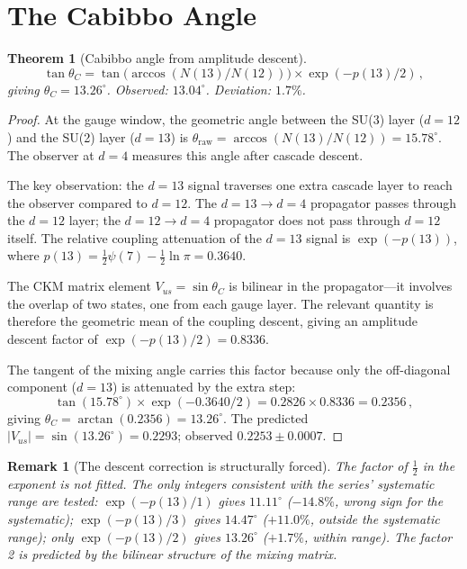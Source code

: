 \documentclass[12pt,a4paper]{article}
\newtheorem{theorem}{Theorem}[section]
\newtheorem*{remark}{Remark}
\begin{document}
\section{The Cabibbo Angle}

\begin{theorem}[Cabibbo angle from amplitude descent]
\begin{equation}
\tan\theta_C = \tan\!\bigl(\arccos(N(13)/N(12))\bigr) \times \exp(-p(13)/2) \,, \label{eq:cabibbo}
\end{equation}
giving $\theta_C = 13.26^\circ$. Observed: $13.04^\circ$. Deviation: $1.7\%$.
\end{theorem}

\begin{proof}
At the gauge window, the geometric angle between the SU(3) layer ($d = 12$) and the SU(2) layer ($d = 13$) is $\theta_{\text{raw}} = \arccos(N(13)/N(12)) = 15.78^\circ$. The observer at $d = 4$ measures this angle after cascade descent.

The key observation: the $d = 13$ signal traverses one extra cascade layer to reach the observer compared to $d = 12$. The $d = 13 \to d = 4$ propagator passes through the $d = 12$ layer; the $d = 12 \to d = 4$ propagator does not pass through $d = 12$ itself. The relative coupling attenuation of the $d = 13$ signal is $\exp(-p(13))$, where $p(13) = \tfrac{1}{2}\psi(7) - \tfrac{1}{2}\ln\pi = 0.3640$.

The CKM matrix element $V_{us} = \sin\theta_C$ is bilinear in the propagator---it involves the overlap of two states, one from each gauge layer. The relevant quantity is therefore the geometric mean of the coupling descent, giving an amplitude descent factor of $\exp(-p(13)/2) = 0.8336$.

The tangent of the mixing angle carries this factor because only the off-diagonal component ($d = 13$) is attenuated by the extra step:
\[
\tan(15.78^\circ) \times \exp(-0.3640/2) = 0.2826 \times 0.8336 = 0.2356\,,
\]
giving $\theta_C = \arctan(0.2356) = 13.26^\circ$. The predicted $|V_{us}| = \sin(13.26^\circ) = 0.2293$; observed $0.2253 \pm 0.0007$.
\end{proof}

\begin{remark}[The descent correction is structurally forced]
The factor of $\tfrac{1}{2}$ in the exponent is not fitted. The only integers consistent with the series' systematic range are tested: $\exp(-p(13)/1)$ gives $11.11^\circ$ ($-14.8\%$, wrong sign for the systematic); $\exp(-p(13)/3)$ gives $14.47^\circ$ ($+11.0\%$, outside the systematic range); only $\exp(-p(13)/2)$ gives $13.26^\circ$ ($+1.7\%$, within range). The factor 2 is predicted by the bilinear structure of the mixing matrix.
\end{remark}
\end{document}
